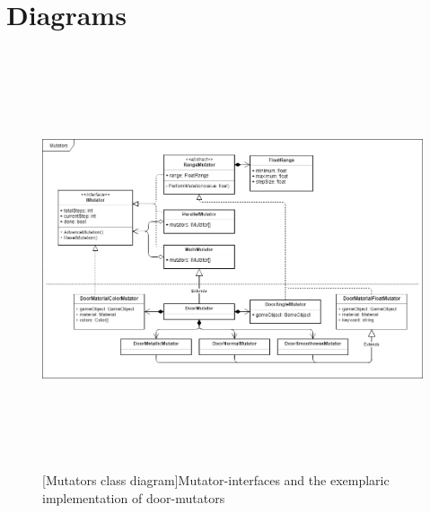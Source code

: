 \chapter{Diagrams}
\begin{figure}
    \centering
    \includegraphics[height=350pt]{img/ch05/ClassDiagram_Mutators_Door03.png}
    [Mutators class diagram]{Mutator-interfaces and the exemplaric implementation of door-mutators}
    \label{fig:classdiagram-mutators}
\end{figure}

